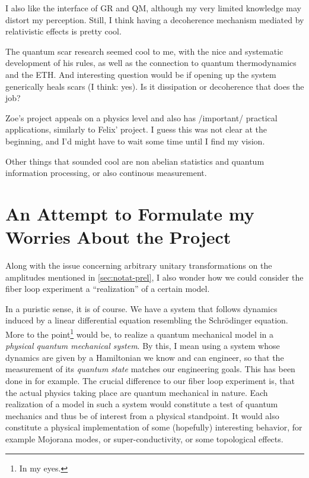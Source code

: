 \documentclass[fontsize=10pt,paper=a4,open=any,
twoside=no,toc=listof,toc=bibliography,headings=optiontohead,
captions=nooneline,captions=tableabove,english,DIV=15,numbers=noenddot,final,parskip=half-,
headinclude=true,footinclude=false,BCOR=0mm]{scrartcl}
\begin{document}
I also like the interface of GR and QM, although my very limited
knowledge may distort my perception. Still, I think having a
decoherence mechanism mediated by relativistic effects is pretty cool.

The quantum scar research seemed cool to me, with the nice and
systematic development of his rules, as well as the connection to
quantum thermodynamics and the ETH. And interesting question would be
if opening up the system generically heals scars (I think: yes). Is it
dissipation or decoherence that does the job?

Zoe's project appeals on a physics level and also has /important/
practical applications, similarly to Felix' project. I guess this was
not clear at the beginning, and I'd might have to wait some time until
I find my vision.

Other things that sounded cool are non abelian statistics and quantum
information processing, or also continous measurement.

\section{An Attempt to Formulate my Worries About the Project}
\label{sec:an-attempt-formulate}


Along with the issue concerning arbitrary unitary transformations on
the amplitudes mentioned in \cref{sec:notat-prel}, I also wonder how
we could consider the fiber loop experiment a ``realization'' of a
certain model.

In a puristic sense, it is of course. We have a system that follows
dynamics induced by a linear differential equation resembling the
Schr\"odinger equation. More to the point\footnote{In my eyes.} would
be, to realize a quantum mechanical model in a \emph{physical quantum
  mechanical system}. By this, I mean using a system whose dynamics
are given by a Hamiltonian we know and can engineer, so that the
measurement of its \emph{quantum state} matches our engineering
goals. This has been done in \cite{Roushan2014} for example. The
crucial difference to our fiber loop experiment is, that the actual
physics taking place are quantum mechanical in nature. Each
realization of a model in such a system would constitute a test of
quantum mechanics and thus be of interest from a physical
standpoint. It would also constitute a physical implementation of some
(hopefully) interesting behavior, for example Mojorana modes, or
super-conductivity, or some topological effects.
\end{document}
